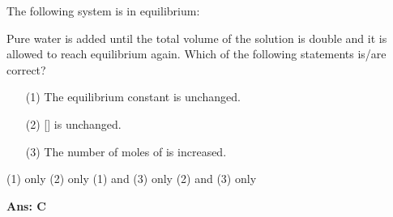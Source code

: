 \documentclass[border=3pt,varwidth=70mm]{standalone}
\begin{document}
 
The following system is in equilibrium:
\begin{center}
\end{center}

Pure water is added until the total volume of the solution is double and it is allowed to reach equilibrium again. Which of the following statements is/are correct?

\begin{itemize}
\item[(1)] The equilibrium constant is unchanged.
\item[(2)] [\ch{Fe(SCN)^{2+}{\aq}}] is unchanged.
\item[(3)] The number of moles of  is increased. 
\end{itemize}

\begin{choices}
\choice (1) only
\choice (2) only
\choice (1) and (3) only
\choice (2) and (3) only
\end{choices}

\begin{answer}
\hrulefill\par
\textbf{Ans: C}

\end{answer}
\end{document}
